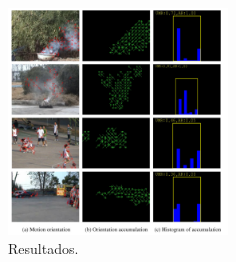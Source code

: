 \documentclass{beamer}
\begin{document}

\begin{frame}{}
	\begin{figure}[H]
		\centering
		\begin{center}
		\includegraphics[width=0.52\textwidth]{img/fig7-artigo2.png}
		\caption{Resultados.}
		\label{fig:sar}
		\end{center}
	\end{figure}
\end{frame}


\section{}
\end{document}
